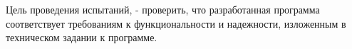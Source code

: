 Цель проведения испытаний, - проверить, что разработанная программа соответствует требованиям к функциональности и надежности, изложенным в техническом задании к программе.
